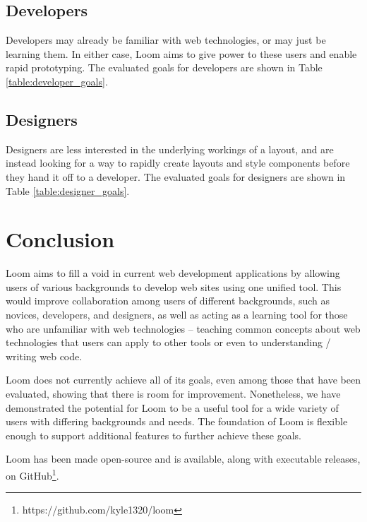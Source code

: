 \documentclass[conference, letterpaper]{IEEEtran}
\begin{document}
\subsection{Developers}
Developers may already be familiar with web technologies, or may just be learning them. In either case, Loom aims to give power to these users and enable rapid prototyping. The evaluated goals for developers are shown in Table \ref{table:developer_goals}.

\subsection{Designers}
Designers are less interested in the underlying workings of a layout, and are instead looking for a way to rapidly create layouts and style components before they hand it off to a developer. The evaluated goals for designers are shown in Table \ref{table:designer_goals}.


\section{Conclusion}
Loom aims to fill a void in current web development applications by allowing users of various backgrounds to develop web sites using one unified tool. This would improve collaboration among users of different backgrounds, such as novices, developers, and designers, as well as acting as a learning tool for those who are unfamiliar with web technologies -- teaching common concepts about web technologies that users can apply to other tools or even to understanding / writing web code.

Loom does not currently achieve all of its goals, even among those that have been evaluated, showing that there is room for improvement. Nonetheless, we have demonstrated the potential for Loom to be a useful tool for a wide variety of users with differing backgrounds and needs. The foundation of Loom is flexible enough to support additional features to further achieve these goals.

Loom has been made open-source and is available, along with executable releases, on GitHub\ifx\isAnonymous\undefined\footnote{https://github.com/kyle1320/loom}\fi.
\end{document}
